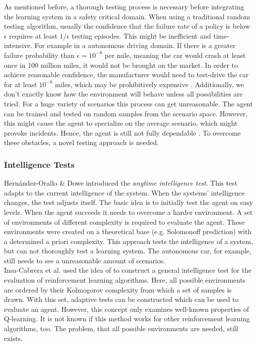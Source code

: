 As mentioned before, a thorough testing process is necessary before integrating the learning system in a safety critical domain. When using a traditional random testing algorithm, usually the confidence that the failure rate of a policy is below $\epsilon$ requires at least $1/\epsilon$ testing episodes. This might be inefficient and time-intensive. For example in a autonomous driving domain. If there is a greater failure probability than $\epsilon = 10^{-8}$ per mile, meaning the car would crash at least once in 100 million miles, it would not be brought on the market. In order to achieve reasonable confidence, the manufacturer would need to test-drive the car for at least $10^{-8}$ miles, which may be prohibitively expensive \cite{uesato18}. Additionally, we don't exactly know how the environment will behave unless all possibilities are tried. For a huge variety of scenarios this process can get unreasonable. The agent can be trained and tested on random samples from the scenario space. However, this might cause the agent to specialize on the average scenario, which might provoke incidents. Hence, the agent is still not fully dependable \cite{gabor19}. To overcome these obstacles, a novel testing approach is needed.

\subsubsection{Intelligence Tests}
\label{intelligence}
Hernández-Orallo \& Dowe \cite{orallo10} introduced the \textit{anytime intelligence test}. This test adapts to the current intelligence of the system. When the systems' intelligence changes, the test adjusts itself. The basic idea is to initially test the agent on easy levels. When the agent succeeds it needs to overcome a harder environment. A set of environments of different complexity is required to evaluate the agent. These environments were created on a theoretical base (e.g. Solomonoff prediction) with a determined a priori complexity. This approach tests the intelligence of a system, but can not thoroughly test a learning system. The autonomous car, for example, still needs to see a unreasonable amount of scenarios.\\
Insa-Cabrera et al. \cite{cabrera11} used the idea of \cite{orallo10} to construct a general intelligence test for the evaluation of reinforcement learning algorithms. Here, all possible environments are ordered by their Kolmogorov complexity from which a set of samples is drawn. With this set, adaptive tests can be constructed which can be used to evaluate an agent. However, this concept only examines well-known properties of Q-learning. It is not known if this method works for other reinforcement learning algorithms, too. The problem, that all possible environments are needed, still exists.

